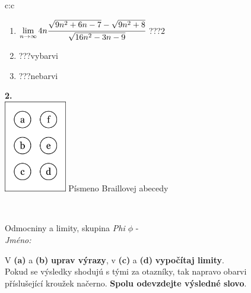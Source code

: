 \documentclass[10pt]{report}
\begin{document}
\begin{tabular}{c:c}
\begin{minipage}[c][104.5mm][t]{0.5\linewidth}
\begin{center}
\begin{minipage}{0.79\linewidth}
\begin{center}
\begin{varwidth}{\linewidth}
\begin{enumerate}
\item $\lim\limits_{n\to\infty}4n\cfrac{\sqrt{9n^2+6n-7}-\sqrt{9n^2+8}}{\sqrt{16n^2-3n-9}}$\quad \dotfill\; ???\;\dotfill \quad $2$
\item \quad \dotfill\; ???\;\dotfill \quad vybarvi
\item \quad \dotfill\; ???\;\dotfill \quad nebarvi
\end{enumerate}
\end{varwidth}
\end{center}
\end{minipage}
\begin{minipage}{0.20\linewidth}
\begin{center}
{\Huge\bfseries 2.} \\[2mm]
\includegraphics[height=40mm]{../images/braille.png}
{\small Písmeno Braillovej abecedy}
\end{center}
\end{minipage}
\end{center}
\end{minipage}
\\ \hdashline
\begin{minipage}[c][104.5mm][t]{0.5\linewidth}
\begin{center}
\vspace{7mm}
{\huge Odmocniny a limity, skupina \textit{Phi $\phi$} -}\\[5mm]
\textit{Jméno:}\phantom{xxxxxxxxxxxxxxxxxxxxxxxxxxxxxxxxxxxxxxxxxxxxxxxxxxxxxxxxxxxxxxxxx}\\[5mm]
\begin{minipage}{0.95\linewidth}
\begin{center}
V \textbf{(a)} a \textbf{(b)} \textbf{uprav výrazy}, v \textbf{(c)} a \textbf{(d)} \textbf{vypočítaj limity}.\\Pokud se výsledky shodujú s tými za otazníky, tak napravo obarvi\\příslušející kroužek načerno. \textbf{Spolu odevzdejte výsledné slovo}.
\end{center}
\end{minipage}
\\[1mm]

\end{center}
\end{minipage}
\end{tabular}
\end{document}

